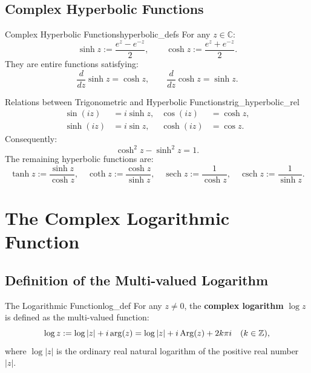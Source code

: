 \subsection{Complex Hyperbolic Functions}

\begin{definition}{Complex Hyperbolic Functions}{hyperbolic_defs}
For any $z \in \mathbb{C}$:
\begin{equation}
\sinh z := \frac{e^z - e^{-z}}{2}, \qquad \cosh z := \frac{e^z + e^{-z}}{2}.
\end{equation}
They are entire functions satisfying:
\begin{equation}
\frac{d}{dz}\sinh z = \cosh z, \qquad \frac{d}{dz}\cosh z = \sinh z.
\end{equation}
\end{definition}

\begin{proposition}{Relations between Trigonometric and Hyperbolic Functions}{trig_hyperbolic_rel}
\begin{align}
\sin(iz) &= i \sinh z, & \cos(iz) &= \cosh z, \\
\sinh(iz) &= i \sin z, & \cosh(iz) &= \cos z.
\end{align}
Consequently:
\begin{equation}
\cosh^2 z - \sinh^2 z = 1.
\end{equation}
The remaining hyperbolic functions are:
\begin{equation}
\tanh z := \frac{\sinh z}{\cosh z}, \quad \coth z := \frac{\cosh z}{\sinh z}, \quad \operatorname{sech} z := \frac{1}{\cosh z}, \quad \operatorname{csch} z := \frac{1}{\sinh z}.
\end{equation}
\end{proposition}


\section{The Complex Logarithmic Function}

\subsection{Definition of the Multi-valued Logarithm}

\begin{definition}{The Logarithmic Function}{log_def}
For any $z \neq 0$, the \textbf{complex logarithm} $\log z$ is defined as the multi-valued function:
\begin{equation}
\log z := \log|z| + i \operatorname{arg}(z) = \log|z| + i\operatorname{Arg}(z) + 2k\pi i \quad (k \in \mathbb{Z}),
\end{equation}
where $\log|z|$ is the ordinary real natural logarithm of the positive real number $|z|$.
\end{definition}

